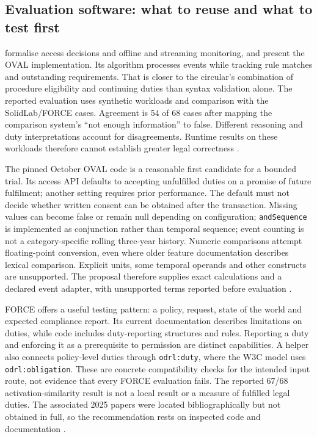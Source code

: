 \subsection{Evaluation software: what to reuse and what to test first}

\citet{oval2026} formalise access decisions and offline and streaming monitoring,
and present the OVAL implementation. Its algorithm processes events while
tracking rule matches and outstanding requirements. That is closer to the
circular's combination of procedure eligibility and continuing duties than
syntax validation alone. The reported evaluation uses synthetic workloads and
comparison with the SolidLab/FORCE cases. Agreement is 54 of 68 cases after
mapping the comparison system's ``not enough information'' to false. Different
reasoning and duty interpretations account for disagreements. Runtime results
on these workloads therefore cannot establish greater legal correctness
\citep[secs.~4--6]{oval2026}.

The pinned October OVAL code is a reasonable first candidate for a bounded
trial. Its access API defaults to accepting unfulfilled duties on a promise of
future fulfilment; another setting requires prior performance. The default
must not decide whether written consent can be obtained after the transaction.
Missing values can become false or remain null depending on configuration;
\texttt{andSequence} is implemented as conjunction rather than temporal
sequence; event counting is not a category-specific rolling three-year
history. Numeric comparisons attempt floating-point conversion, even where
older feature documentation describes lexical comparison. Explicit units,
some temporal operands and other constructs are unsupported. The proposal
therefore supplies exact calculations and a declared event adapter, with
unsupported terms reported before evaluation \citep{hkmaodrlsoftware2026}.

FORCE offers a useful testing pattern: a policy, request, state of the world
and expected compliance report. Its current documentation describes limitations
on duties, while code includes duty-reporting structures and rules. Reporting
a duty and enforcing it as a prerequisite to permission are distinct
capabilities. A helper also connects policy-level duties through
\texttt{odrl:duty}, where the W3C model uses \texttt{odrl:obligation}.
These are concrete compatibility checks for the intended input route, not
evidence that every FORCE evaluation fails. The reported 67/68
activation-similarity result is not a local result or a measure of fulfilled
legal duties. The associated 2025 papers were located bibliographically but
not obtained in full, so the recommendation rests on inspected code and
documentation \citep{hkmaodrlsoftware2026}.


